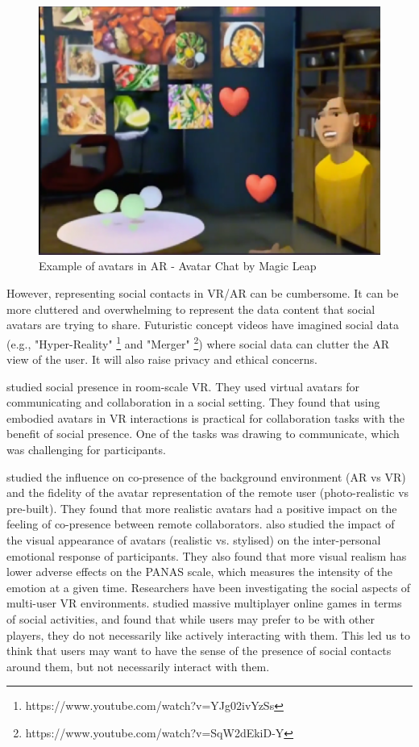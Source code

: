 \begin{figure}
    \centering
    \includegraphics[width=0.8\linewidth]{images/20-background/avatar-chat-1.eps}
    \caption{Example of avatars in AR - Avatar Chat by Magic Leap}
    \label{fig:ml-avatar-chat-2}
\end{figure}

However, representing social contacts in VR/AR can be cumbersome. It can be more cluttered and overwhelming to represent the data content that social avatars are trying to share. Futuristic concept videos have imagined social data (e.g., "Hyper-Reality" \footnote{https://www.youtube.com/watch?v=YJg02ivYzSs} and "Merger" \footnote{https://www.youtube.com/watch?v=SqW2dEkiD-Y}) where social data can clutter the AR view of the user. It will also raise privacy and ethical concerns.

\textcite{Greenwald2017} studied social presence in room-scale VR. They used virtual avatars for communicating and collaboration in a social setting. They found that using embodied avatars in VR interactions is practical for collaboration tasks with the benefit of social presence. One of the tasks was drawing to communicate, which was challenging for participants. 

\textcite{Jo2016} studied the influence on co-presence of the background environment (AR vs VR) and the fidelity of the avatar representation of the remote user (photo-realistic vs pre-built). They found that more realistic avatars had a positive impact on the feeling of co-presence between remote collaborators. \textcite{Volante2016} also studied the impact of the visual appearance of avatars (realistic vs. stylised) on the inter-personal emotional response of participants. They also found that more visual realism has lower adverse effects on the PANAS scale, which measures the intensity of the emotion at a given time. Researchers have been investigating the social aspects of multi-user VR environments. \textcite{Ducheneaut2006} studied massive multiplayer online games in terms of social activities, and found that while users may prefer to be with other players, they do not necessarily like actively interacting with them. This led us to think that users may want to have the sense of the presence of social contacts around them, but not necessarily interact with them.

